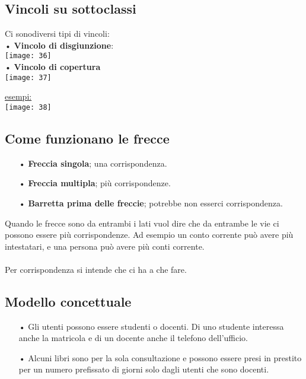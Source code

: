 \documentclass[12pt, letterpaper]{article}
\begin{document}
\subsection{Vincoli su sottoclassi}

Ci sonodiversi tipi di vincoli:
\\
• \textbf{Vincolo di disgiunzione}:
\\
\texttt{[image: 36]}
\\
• \textbf{Vincolo di copertura}
\\
\texttt{[image: 37]}

\newpage

\underline{esempi:}
\\
\texttt{[image: 38]}

\subsection{Come funzionano le frecce}

\begin{itemize}
   \item[•] \textbf{Freccia singola}; una corrispondenza. 
   \item[•] \textbf{Freccia multipla}; più corrispondenze.
   \item[•] \textbf{Barretta prima delle freccie}; potrebbe non esserci corrispondenza.
\end{itemize}
Quando le frecce sono da entrambi i lati vuol dire che da entrambe le vie ci possono essere 
più corrispondenze. Ad esempio un conto corrente può avere più intestatari, e una persona può avere più conti corrente.
\\
\\
Per corrispondenza si intende che ci ha a che fare.

\newpage

\subsection{Modello concettuale}

\begin{itemize}
   \item[•] Gli utenti possono essere studenti o docenti. Di uno studente interessa anche la matricola e di un docente anche il telefono dell’ufficio.
   \item[•] Alcuni libri sono per la sola consultazione e possono essere presi in prestito per un numero prefissato di giorni solo dagli utenti che sono docenti.
\end{itemize}
\end{document}
